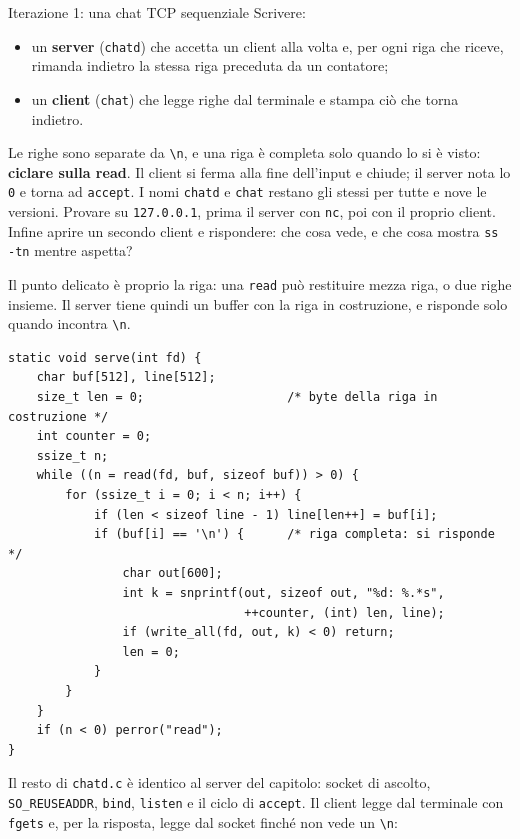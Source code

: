 \begin{esercizio}{Iterazione 1: una chat TCP sequenziale}
Scrivere:
\begin{itemize}
    \item un \textbf{server} (\texttt{chatd}) che accetta un client alla volta e, per ogni riga che riceve, rimanda
          indietro la stessa riga preceduta da un contatore;
    \item un \textbf{client} (\texttt{chat}) che legge righe dal terminale e stampa ciò che torna indietro.
\end{itemize}
Le righe sono separate da \texttt{\textbackslash n}, e una riga è completa solo quando lo si è visto: \textbf{ciclare
sulla read}. Il client si ferma alla fine dell'input e chiude; il server nota lo \texttt{0} e torna ad \texttt{accept}.
I nomi \texttt{chatd} e \texttt{chat} restano gli stessi per tutte e nove le versioni. Provare su \texttt{127.0.0.1},
prima il server con \texttt{nc}, poi con il proprio client. Infine aprire un secondo client e rispondere: che cosa vede, e
che cosa mostra \texttt{ss -tn} mentre aspetta?

\svolgimento
Il punto delicato è proprio la riga: una \texttt{read} può restituire mezza riga, o due righe insieme. Il server tiene
quindi un buffer con la riga in costruzione, e risponde solo quando incontra \texttt{\textbackslash n}.

\begin{lstlisting}[language={[POSIX]C}, style=wnumbers, title={chatd.c: la conversazione}]
static void serve(int fd) {
    char buf[512], line[512];
    size_t len = 0;                    /* byte della riga in costruzione */
    int counter = 0;
    ssize_t n;
    while ((n = read(fd, buf, sizeof buf)) > 0) {
        for (ssize_t i = 0; i < n; i++) {
            if (len < sizeof line - 1) line[len++] = buf[i];
            if (buf[i] == '\n') {      /* riga completa: si risponde */
                char out[600];
                int k = snprintf(out, sizeof out, "%d: %.*s",
                                 ++counter, (int) len, line);
                if (write_all(fd, out, k) < 0) return;
                len = 0;
            }
        }
    }
    if (n < 0) perror("read");
}
\end{lstlisting}

Il resto di \texttt{chatd.c} è identico al server del capitolo: socket di ascolto, \texttt{SO\_REUSEADDR},
\texttt{bind}, \texttt{listen} e il ciclo di \texttt{accept}. Il client legge dal terminale con \texttt{fgets} e, per
la risposta, legge dal socket finché non vede un \texttt{\textbackslash n}:


\end{esercizio}
